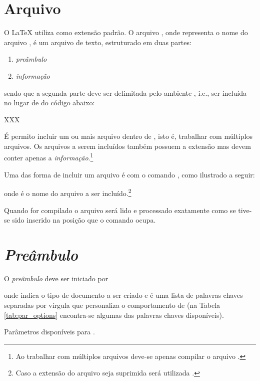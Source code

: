 \section{Arquivo } \label{sse:basic:tex}
O LaTeX utiliza  como extensão padrão. O
arquivo , onde  representa o nome do arquivo
, é um arquivo de texto, estruturado em duas partes:
\begin{enumerate}
  \item \emph{preâmbulo}
  \item \emph{informação}
\end{enumerate}
sendo que a segunda parte deve ser delimitada pelo ambiente ,
i.e., ser incluída no lugar de  do código abaixo:
\begin{code}
  
  XXX
  
\end{code}

É permito incluir um ou mais arquivo dentro de , isto é,
trabalhar com múltiplos arquivos.
Os arquivos a serem incluídos também possuem a extensão  mas devem
conter apenas a \emph{informação}.\footnote{Ao trabalhar com múltiplos arquivos
deve-se apenas compilar o arquivo .}

Uma das forma de incluir um arquivo é com o comando
\lstinline!!, como ilustrado a
seguir:
\begin{code}
  
\end{code}
onde  é o nome do arquivo a ser incluído.\footnote{Caso a
extensão do arquivo seja suprimida será utilizada .}

Quando  for compilado o arquivo  será lido e
processado exatamente como se tive-se sido inserido na posição que o comando
\lstinline!! ocupa.

\section{\emph{Preâmbulo}} \label{sse:basic:preamble}
O \emph{preâmbulo} deve ser iniciado por
onde 
indica o tipo de documento a ser criado e  é uma lista de
palavras chaves separadas por vírgula que personaliza o comportamento de
 (na Tabela \ref{tab:par_options} encontra-se algumas das palavras
chaves disponíveis).
\begin{table}[h!tb]
  \centering
  \caption{Parâmetros disponíveis para .} \label{tab:par_options}
  
\end{table}

